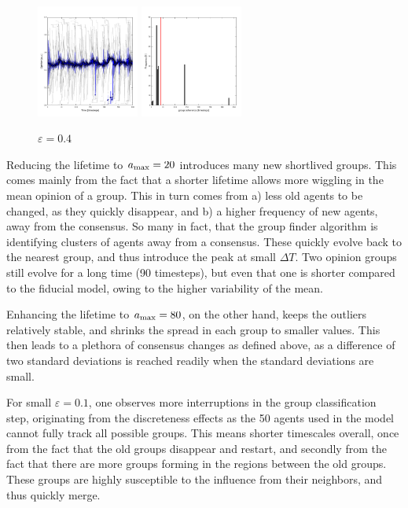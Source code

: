 \documentclass[useAMS,usenatbib]{templates/mn2e}
\begin{document}
\begin{figure}
  \begin{center}
    \includegraphics[width=0.3\textwidth]{fig/evol_04.pdf}
    \includegraphics[width=0.3\textwidth]{fig/var_04.pdf}
  \end{center}
  \caption{\label{fig:04}$\varepsilon=0.4$}
\end{figure}

Reducing the lifetime to $a_{\rm max}=20$ introduces many new
shortlived groups. This comes mainly from the fact that a shorter
lifetime allows more wiggling in the mean opinion of a group. This in
turn comes from a) less old agents to be changed, as they quickly
disappear, and b) a higher frequency of new agents, away from the
consensus. So many in fact, that the group finder algorithm is
identifying clusters of agents away from a consensus. These quickly
evolve back to the nearest group, and thus introduce the peak at small
$\Delta T$. Two opinion groups still evolve for a long time (90
timesteps), but even that one is shorter compared to the fiducial
model, owing to the higher variability of the mean.

Enhancing the lifetime to $a_{\rm max}=80$, on the other hand,
keeps the outliers relatively stable, and shrinks the spread in each
group to smaller values. This then leads to a plethora of consensus
changes as defined above, as a difference of two standard deviations
is reached readily when the standard deviations are small.


For small $\varepsilon=0.1$, one observes more
interruptions in the group classification step, originating from the
discreteness effects as the 50 agents used in the model cannot fully track all possible groups. This means shorter
timescales overall, once from the fact that the old groups disappear
and restart, and secondly from the fact that there are more groups
forming in the regions between the old groups. These groups are highly
susceptible to the influence from their neighbors, and thus quickly
merge.
\end{document}
